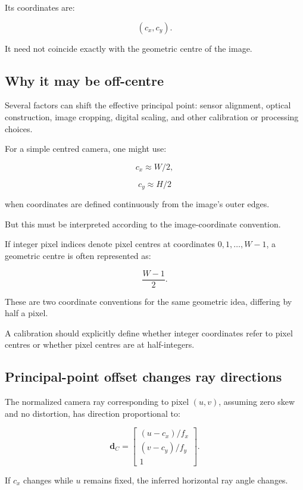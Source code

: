 Its coordinates are:

\[
 \boxed{(c_x,c_y)}.
\]

It need not coincide exactly with the geometric centre of the image.

\subsection{Why it may be off-centre}\label{02-foundations-ii-ch034-why-it-may-be-off-centre}

Several factors can shift the effective principal point: sensor alignment, optical construction, image cropping, digital scaling, and other calibration or processing choices.

For a simple centred camera, one might use:

\[
 c_x\approx W/2,
\]

\[
 c_y\approx H/2
\]

when coordinates are defined continuously from the image's outer edges.

But this must be interpreted according to the image-coordinate convention.

If integer pixel indices denote pixel centres at coordinates \(0,1,\ldots,W-1\), a geometric centre is often represented as:

\[
 \frac{W-1}{2}.
\]

These are two coordinate conventions for the same geometric idea, differing by half a pixel.

A calibration should explicitly define whether integer coordinates refer to pixel centres or whether pixel centres are at half-integers.

\subsection{Principal-point offset changes ray directions}\label{02-foundations-ii-ch034-principal-point-offset-changes-ray-directions}

The normalized camera ray corresponding to pixel \((u,v)\), assuming zero skew and no distortion, has direction proportional to:

\[
 \boxed{ \mathbf d_C= \begin{bmatrix} (u-c_x)/f_x\\ (v-c_y)/f_y\\ 1 \end{bmatrix} }.
\]

If \(c_x\) changes while \(u\) remains fixed, the inferred horizontal ray angle changes.

